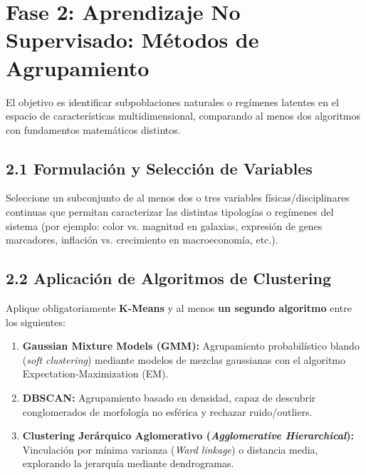 \documentclass[11pt,a4paper]{article}
\begin{document}
\section{Fase 2: Aprendizaje No Supervisado: Métodos de Agrupamiento}
\label{sec:fase2}

\begin{fasebox}
El objetivo es identificar subpoblaciones naturales o regímenes latentes en el espacio de características multidimensional, comparando al menos dos algoritmos con fundamentos matemáticos distintos.
\end{fasebox}

\subsection{2.1 Formulación y Selección de Variables}
Seleccione un subconjunto de al menos dos o tres variables físicas/disciplinares continuas que permitan caracterizar las distintas tipologías o regímenes del sistema (por ejemplo: color vs. magnitud en galaxias, expresión de genes marcadores, inflación vs. crecimiento en macroeconomía, etc.).

\subsection{2.2 Aplicación de Algoritmos de Clustering}
Aplique obligatoriamente \textbf{K-Means} y al menos \textbf{un segundo algoritmo} entre los siguientes:
\begin{enumerate}[leftmargin=*,itemsep=2pt]
    \item \textbf{Gaussian Mixture Models (GMM):} Agrupamiento probabilístico blando (\textit{soft clustering}) mediante modelos de mezclas gaussianas con el algoritmo Expectation-Maximization (EM).
    \item \textbf{DBSCAN:} Agrupamiento basado en densidad, capaz de descubrir conglomerados de morfología no esférica y rechazar ruido/outliers.
    \item \textbf{Clustering Jerárquico Aglomerativo (\textit{Agglomerative Hierarchical}):} Vinculación por mínima varianza (\textit{Ward linkage}) o distancia media, explorando la jerarquía mediante dendrogramas.
\end{enumerate}
\end{document}
